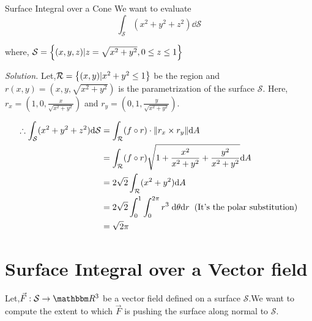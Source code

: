 \documentclass[Analysis-3]{subfiles}
\begin{document}
\begin{Eg}{Surface Integral over a Cone}{}
We want to evaluate \[ \int_{\mathcal{S}}(x^2+y^2+z^2) \dd \mathcal{S}\]    

where, $\mathcal{S} = \qty{(x,y,z) | z = \sqrt{x^2 + y^2},0 \le z \le 1}$

\textit{Solution.} Let,$\mathcal{R} = \qty{(x,y)| x^2+y^2 \le 1}$ be the region and $r(x,y) = (x,y,\sqrt{x^2+y^2})$ is the parametrization of the surface $\mathcal{S}$. Here, $r_x = (1,0, \frac{x}{\sqrt{x^2+y^2}})$ and $r_y = (0,1,\frac{y}{\sqrt{x^2+y^2}})$.


\begin{align*}
    \therefore \int_{\mathcal{S}}(x^2+y^2+z^2) \dd \mathcal{S} &= \int_{\mathcal{R}} (f\circ r) \cdot \norm{r_x \times r_y} \dd A \\
    &= \int_{\mathcal{R}} (f\circ r) \sqrt{1 + \frac{x^2}{x^2+y^2} + \frac{y^2}{x^2+y^2}} \dd A \\
    &= 2\sqrt{2} \int_{\mathcal{R}} (x^2+y^2) \dd A \\
    &= 2\sqrt{2} \int_{0}^{1} \int_{0}^{2\pi} r^3 \hspace{0.1cm} \dd \theta \dd r \hspace{0.2cm} (\text{It's the polar substitution})\\
    &= \sqrt{2} \pi 
\end{align*}

\end{Eg}

\section{Surface Integral over a Vector field}

Let,$\vec{F} : \mathcal{S} \to \R^3$ be a vector field defined on a surface $\mathcal{S}$.We want to compute the extent to which $\vec{F}$ is pushing the surface along normal to $\mathcal{S}$.

\end{document}
